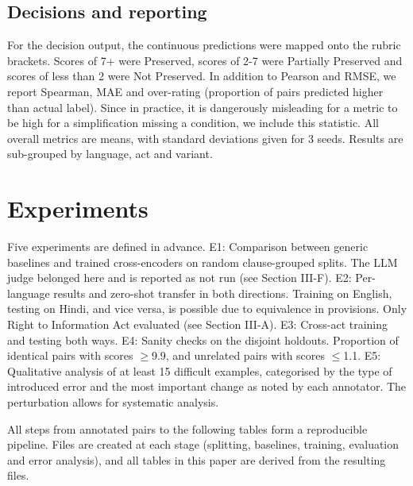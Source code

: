 \documentclass[conference]{IEEEtran}
\begin{document}
\subsection{Decisions and reporting}

For the decision output, the continuous predictions were mapped onto the rubric brackets. Scores of 7+ were Preserved, scores of 2-7 were Partially Preserved and scores of less than 2 were Not Preserved. In addition to Pearson and RMSE, we report Spearman, MAE and over-rating (proportion of pairs predicted higher than actual label). Since in practice, it is dangerously misleading for a metric to be high for a simplification missing a condition, we include this statistic. All overall metrics are means, with standard deviations given for 3 seeds. Results are sub-grouped by language, act and variant.

\section{Experiments}

Five experiments are defined in advance. E1: Comparison between generic baselines and trained cross-encoders on random clause-grouped splits. The LLM judge belonged here and is reported as not run (see Section III-F). E2: Per-language results and zero-shot transfer in both directions. Training on English, testing on Hindi, and vice versa, is possible due to equivalence in provisions. Only Right to Information Act evaluated (see Section III-A). E3: Cross-act training and testing both ways. E4: Sanity checks on the disjoint holdouts. Proportion of identical pairs with scores \ensuremath{\geq}9.9, and unrelated pairs with scores \ensuremath{\leq}1.1. E5: Qualitative analysis of at least 15 difficult examples, categorised by the type of introduced error and the most important change as noted by each annotator. The perturbation allows for systematic analysis.

All steps from annotated pairs to the following tables form a reproducible pipeline. Files are created at each stage (splitting, baselines, training, evaluation and error analysis), and all tables in this paper are derived from the resulting files.
\end{document}
